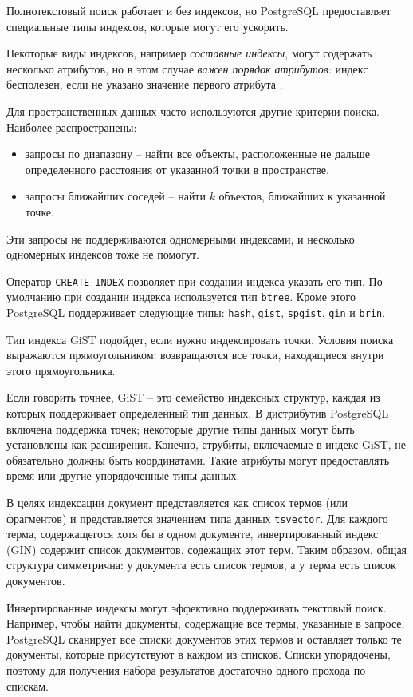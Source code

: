 \documentclass[%
	11pt,
	a4paper,
	utf8,
		]{article}
\begin{document}
Полнотекстовый поиск работает и без индексов, но PostgreSQL предоставляет специальные типы индексов, которые могут его ускорить.

Некоторые виды индексов, например \emph{составные индексы}, могут содержать несколько атрибутов, но в этом случае \emph{важен порядок атрибутов}: индекс бесполезен, если не указано значение первого атрибута \cite[]{dombrovskaya:postgresql-2022}.

Для пространственных данных часто используются другие критерии поиска. Наиболее распространены:
\begin{itemize}
	\item запросы по диапазону -- найти все объекты, расположенные не дальше определенного расстояния от указанной точки в пространстве,
	
	\item запросы ближайших соседей -- найти $ k $ объектов, ближайших к указанной точке.
\end{itemize}

Эти запросы не поддерживаются одномерными индексами, и несколько одномерных индексов тоже не помогут.

Оператор \verb|CREATE INDEX| позволяет при создании индекса указать его тип. По умолчанию при создании индекса используется тип \verb|btree|. Кроме этого PostgreSQL поддерживает следующие типы: \verb|hash|, \verb|gist|, \verb|spgist|, \verb|gin| и \verb|brin|.

Тип индекса GiST подойдет, если нужно индексировать точки. Условия поиска выражаются прямоугольником: возвращаются все точки, находящиеся внутри этого прямоугольника.

Если говорить точнее, GiST -- это семейство индексных структур, каждая из которых поддерживает определенный тип данных. В дистрибутив PostgreSQL включена поддержка точек; некоторые другие типы данных могут быть установлены как расширения. Конечно, атрубиты, включаемые в индекс GiST, не обязательно должны быть координатами. Такие атрибуты могут предоставлять время или другие упорядоченные типы данных.

В целях индексации документ представляется как список термов (или фрагментов) и представляется значением типа данных \verb|tsvector|. Для каждого терма, содержащегося хотя бы в одном документе, инвертированный индекс (GIN) содержит список документов, содежащих этот терм. Таким образом, общая структура симметрична: у документа есть список термов, а у терма есть список документов. 

Инвертированные индексы могут эффективно поддерживать текстовый поиск. Например, чтобы найти документы, содержащие все термы, указанные в запросе, PostgreSQL сканирует все списки документов этих термов и оставляет только те документы, которые присутствуют в каждом из списков. Списки упорядочены, поэтому для получения набора результатов достаточно одного прохода по спискам.
\end{document}
